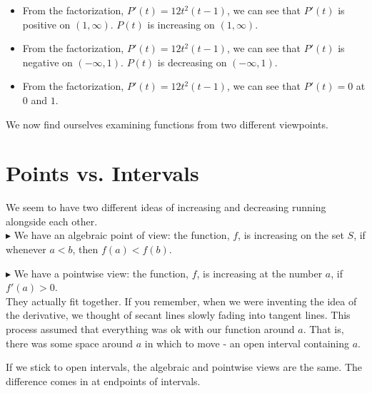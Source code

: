 \documentclass{ximera}
\begin{document}
\begin{example}
\begin{explanation}
\begin{itemize}
\item From the factorization, $P'(t) = 12 t^2 (t-1)$, we can see that $P'(t)$ is positive on $(1, \infty)$. $P(t)$ is increasing on $(1, \infty)$. \\
\item From the factorization, $P'(t) = 12 t^2 (t-1)$, we can see that $P'(t)$ is negative on $(-\infty, 1)$. $P(t)$ is decreasing on $(-\infty, 1)$. \\
\item From the factorization, $P'(t) = 12 t^2 (t-1)$, we can see that $P'(t) = 0$ at $0$ and $1$. \\
\end{itemize}


\end{explanation}
\end{example}

We now find ourselves examining functions from two different viewpoints. \\



\section*{ Points vs. Intervals}




We seem to have two different ideas of increasing and decreasing running alongside each other. \\



\textbf{\textcolor{red!90!darkgray}{$\blacktriangleright$}} We have an algebraic point of view: the function, $f$, is increasing on the set $S$, if whenever $a < b$, then $f(a) < f(b)$.



\textbf{\textcolor{red!90!darkgray}{$\blacktriangleright$}} We have a pointwise view: the function, $f$, is increasing at the number $a$, if $f'(a) > 0$. \\



They actually fit together. If you remember, when we were inventing the idea of the derivative, we thought of secant lines slowly fading into tangent lines.  This process assumed that everything was ok with our function around $a$.  That is, there was some space around $a$ in which to move - an open interval containing $a$.

If we stick to open intervals, the algebraic and pointwise views are the same.  The difference comes in at endpoints of intervals. \\
\end{document}

